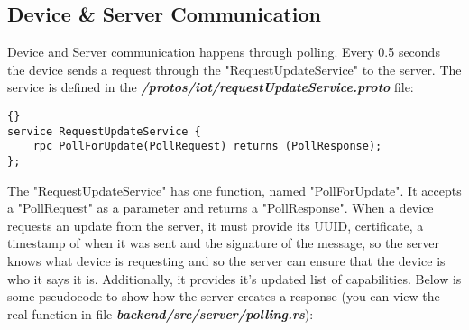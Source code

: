 \subsection{Device \& Server Communication}
Device and Server communication happens through polling. Every 0.5 seconds the device sends a request through the "RequestUpdateService" to the server. The service is defined in the \textit{\textbf{/protos/iot/requestUpdateService.proto}} file:
\begin{lstlisting}[language=protobuf3, style=boxed, showstringspaces=false]{}
service RequestUpdateService {
    rpc PollForUpdate(PollRequest) returns (PollResponse);
};
\end{lstlisting}
The "RequestUpdateService" has one function, named "PollForUpdate". It accepts a "PollRequest" as a parameter and returns a "PollResponse". When a device requests an update from the server, it must provide its UUID, certificate, a timestamp of when it was sent and the signature of the message, so the server knows what device is requesting and so the server can ensure that the device is who it says it is. Additionally, it provides it's updated list of capabilities. Below is some pseudocode to show how the server creates a response (you can view the real function in file \textit{\textbf{backend/src/server/polling.rs}}): 

